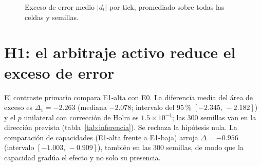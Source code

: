 \begin{figure}[htbp]
\centering
{}
\caption{Exceso de error medio $|d_t|$ por tick, promediado sobre todas las celdas y semillas.}
\label{fig:trayectorias}
\end{figure}

\section{H1: el arbitraje activo reduce el exceso de error}
\label{sec:res-h1}

El contraste primario compara E1-alta con E0. La diferencia media del área de exceso es $\Delta_1=-2.263$ (mediana $-2.078$; intervalo del 95\,\% $[-2.345,\,-2.182]$) y el $p$ unilateral con corrección de Holm es $1.5\times10^{-4}$; las 300 semillas van en la dirección prevista (tabla~\ref{tab:inferencia}). Se rechaza la hipótesis nula. La comparación de capacidades (E1-alta frente a E1-baja) arroja $\Delta=-0.956$ (intervalo $[-1.003,\,-0.909]$), también en las 300 semillas, de modo que la capacidad gradúa el efecto y no solo su presencia.

